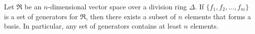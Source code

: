 Let $\Re$ be an $n$-dimensional vector space over a division ring $\Delta$. If $\{f_1, f_2, \ldots, f_m\}$ is a set of generators for $\Re$, then there exists a subset of $n$ elements that forms a basis. In particular, any set of generators contains at least $n$ elements.
